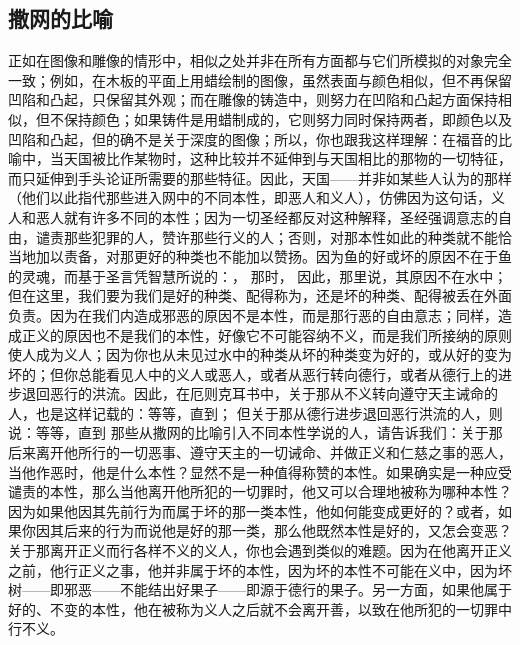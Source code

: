 \subsection{撒网的比喻}

 正如在图像和雕像的情形中，相似之处并非在所有方面都与它们所模拟的对象完全一致；例如，在木板的平面上用蜡绘制的图像，虽然表面与颜色相似，但不再保留凹陷和凸起，只保留其外观；而在雕像的铸造中，则努力在凹陷和凸起方面保持相似，但不保持颜色；如果铸件是用蜡制成的，它则努力同时保持两者，即颜色以及凹陷和凸起，但的确不是关于深度的图像；所以，你也跟我这样理解：在福音的比喻中，当天国被比作某物时，这种比较并不延伸到与天国相比的那物的一切特征，而只延伸到手头论证所需要的那些特征。因此，天国——并非如某些人认为的那样（他们以此指代那些进入网中的不同本性，即恶人和义人），仿佛因为这句话，义人和恶人就有许多不同的本性；因为一切圣经都反对这种解释，圣经强调意志的自由，谴责那些犯罪的人，赞许那些行义的人；否则，对那本性如此的种类就不能恰当地加以责备，对那更好的种类也不能加以赞扬。因为鱼的好或坏的原因不在于鱼的灵魂，而基于圣言凭智慧所说的：， 那时， 因此，那里说，其原因不在水中；但在这里，我们要为我们是好的种类、配得称为，还是坏的种类、配得被丢在外面负责。因为在我们内造成邪恶的原因不是本性，而是那行恶的自由意志；同样，造成正义的原因也不是我们的本性，好像它不可能容纳不义，而是我们所接纳的原则使人成为义人；因为你也从未见过水中的种类从坏的种类变为好的，或从好的变为坏的；但你总能看见人中的义人或恶人，或者从恶行转向德行，或者从德行上的进步退回恶行的洪流。因此，在厄则克耳书中，关于那从不义转向遵守天主诫命的人，也是这样记载的：等等，直到； 但关于那从德行进步退回恶行洪流的人，则说：等等，直到 那些从撒网的比喻引入不同本性学说的人，请告诉我们：关于那后来离开他所行的一切恶事、遵守天主的一切诫命、并做正义和仁慈之事的恶人，当他作恶时，他是什么本性？显然不是一种值得称赞的本性。如果确实是一种应受谴责的本性，那么当他离开他所犯的一切罪时，他又可以合理地被称为哪种本性？因为如果他因其先前行为而属于坏的那一类本性，他如何能变成更好的？或者，如果你因其后来的行为而说他是好的那一类，那么他既然本性是好的，又怎会变恶？关于那离开正义而行各样不义的义人，你也会遇到类似的难题。因为在他离开正义之前，他行正义之事，他并非属于坏的本性，因为坏的本性不可能在义中，因为坏树——即邪恶——不能结出好果子——即源于德行的果子。另一方面，如果他属于好的、不变的本性，他在被称为义人之后就不会离开善，以致在他所犯的一切罪中行不义。\par

